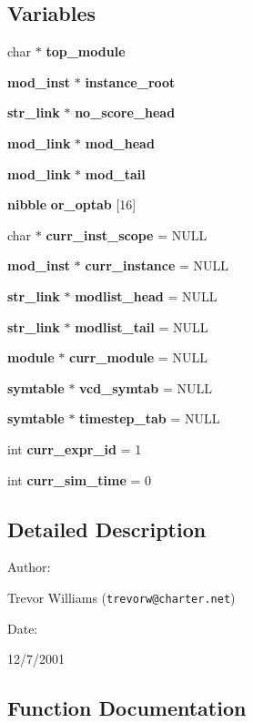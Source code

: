 \subsection*{Variables}
\begin{CompactItemize}
\item 
char $\ast$ {\bf top\_\-module}
\item 
{\bf mod\_\-inst} $\ast$ {\bf instance\_\-root}
\item 
{\bf str\_\-link} $\ast$ {\bf no\_\-score\_\-head}
\item 
{\bf mod\_\-link} $\ast$ {\bf mod\_\-head}
\item 
{\bf mod\_\-link} $\ast$ {\bf mod\_\-tail}
\item 
{\bf nibble} {\bf or\_\-optab} [16]
\item 
char $\ast$ {\bf curr\_\-inst\_\-scope} = NULL
\item 
{\bf mod\_\-inst} $\ast$ {\bf curr\_\-instance} = NULL
\item 
{\bf str\_\-link} $\ast$ {\bf modlist\_\-head} = NULL
\item 
{\bf str\_\-link} $\ast$ {\bf modlist\_\-tail} = NULL
\item 
{\bf module} $\ast$ {\bf curr\_\-module} = NULL
\item 
{\bf symtable} $\ast$ {\bf vcd\_\-symtab} = NULL
\item 
{\bf symtable} $\ast$ {\bf timestep\_\-tab} = NULL
\item 
int {\bf curr\_\-expr\_\-id} = 1
\item 
int {\bf curr\_\-sim\_\-time} = 0
\end{CompactItemize}


\subsection{Detailed Description}


\begin{Desc}
\item[Author: ]\par
Trevor Williams ({\tt trevorw@charter.net}) \end{Desc}
\begin{Desc}
\item[Date: ]\par
12/7/2001\end{Desc}


\subsection{Function Documentation}
